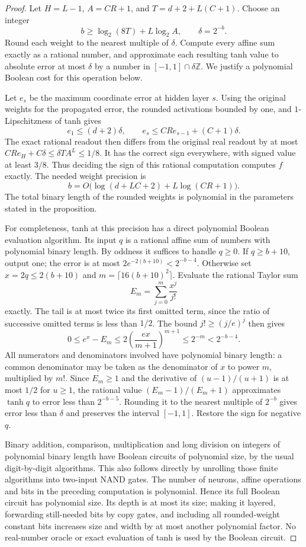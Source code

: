 \begin{proof}
Let $H=L-1$, $A=CR+1$, and $T=d+2+L(C+1)$. Choose an integer
\[
 b\ge\log_2(8T)+L\log_2A,
 \qquad \delta=2^{-b}.
\]
Round each weight to the nearest multiple of $\delta$. Compute every
affine sum exactly as a rational number, and approximate each resulting
tanh value to absolute error at most $\delta$ by a number in
$[-1,1]\cap\delta\mathbb Z$. We justify a polynomial Boolean cost
for this operation below.

Let $e_s$ be the maximum coordinate error at hidden layer $s$.
Using the original weights for the propagated error, the rounded
activations bounded by one, and $1$-Lipschitzness of tanh gives
\[
 e_1\le(d+2)\delta,\qquad
 e_s\le CR e_{s-1}+(C+1)\delta.
\]
The exact rational readout then differs from the original real
readout by at most $CR e_H+C\delta\le\delta T A^L\le1/8$.
It has the correct sign everywhere, with signed value at least $3/8$.
Thus deciding the sign of this rational computation computes $f$
exactly. The needed weight precision is
\[
 b=O\bigl(\log(d+LC+2)+L\log(CR+1)\bigr).
\]
The total binary length of the rounded weights is polynomial in the
parameters stated in the proposition.

For completeness, tanh at this precision has a direct polynomial
Boolean evaluation algorithm. Its input $q$ is a rational affine sum
of numbers with polynomial binary length. By oddness it suffices to
handle $q\ge0$. If $q\ge b+10$, output one; the error is at most
$2e^{-2(b+10)}<2^{-b-4}$. Otherwise set $x=2q\le2(b+10)$ and
$m=\lceil16(b+10)^2\rceil$. Evaluate the rational Taylor sum
\[
 E_m=\sum_{j=0}^{m}\frac{x^j}{j!}
\]
exactly. The tail is at most twice its first omitted term, since the
ratio of successive omitted terms is less than $1/2$. The bound
$j!\ge(j/e)^j$ then gives
\[
 0\le e^x-E_m
 \le2\left(\frac{ex}{m+1}\right)^{m+1}
 \le2^{-m}<2^{-b-4}.
\]
All numerators and denominators involved have polynomial binary length:
a common denominator may be taken as the denominator of $x$ to power
$m$, multiplied by $m!$. Since $E_m\ge1$ and the derivative of
$(u-1)/(u+1)$ is at most $1/2$ for $u\ge1$, the rational value
$(E_m-1)/(E_m+1)$ approximates $\tanh q$ to error less than
$2^{-b-5}$. Rounding it to the nearest multiple of $2^{-b}$ gives
error less than $\delta$ and preserves the interval $[-1,1]$.
Restore the sign for negative $q$.

Binary addition, comparison, multiplication and long division on
integers of polynomial binary length have Boolean circuits of polynomial size,
by the usual digit-by-digit algorithms. This also follows directly by
unrolling those finite algorithms into two-input NAND gates. The number
of neurons, affine operations and bits in the preceding computation
is polynomial. Hence its full Boolean circuit has polynomial size.
Its depth is at most its size; making it layered, forwarding still-needed
bits by copy gates, and including all rounded-weight constant bits
increases size and width by at most another polynomial factor.
No real-number oracle or exact evaluation of tanh is used by the Boolean
circuit.
\end{proof}

